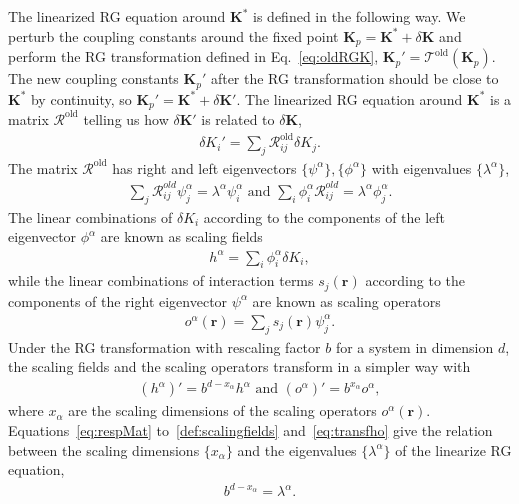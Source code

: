 \documentclass[aps,prr,reprint,superscriptaddress,floatfix]{revtex4-2}
\begin{document}
The linearized RG equation around $\mathbf{K}^{*}$ is defined in the following way.
We perturb the coupling constants around the fixed point $\mathbf{K}_p = \mathbf{K}^{*} + \delta \mathbf{K}$ and perform the RG transformation defined in Eq.~\eqref{eq:oldRGK}, $\mathbf{K}_p' = \mathcal{T}^{\text{old}}\left(\mathbf{K}_p\right)$. 
The new coupling constants $\mathbf{K}_p'$ after the RG transformation should be close to $\mathbf{K}^{*}$ by continuity, so $\mathbf{K}_p' = \mathbf{K}^{*} + \delta \mathbf{K}'$.
The linearized RG equation around $\mathbf{K}^{*}$ is a matrix $\mathcal{R}^{\text{old}}$ telling us how $\delta \mathbf{K}'$ is related to $\delta \mathbf{K}$,
%
\begin{align}\label{eq:respMat}
    \delta K_i' = \sum_j\mathcal{R}^{\text{old}}_{ij} \delta K_j.
\end{align}
%
The matrix $\mathcal{R}^{\text{old}}$ has right and left eigenvectors $\{\psi^{\alpha}\}, \{\phi^{\alpha}\}$ with eigenvalues $\{\lambda^{\alpha}\}$,
%
\begin{align}\label{eq:eigsofRespM}
    \sum_j \mathcal{R}^{old}_{ij} \psi^{\alpha}_j = \lambda^{\alpha}
    \psi^{\alpha}_i \text{ and } \sum_i \phi^{\alpha}_i
    \mathcal{R}^{old}_{ij} = \lambda^{\alpha} \phi^{\alpha}_j.
\end{align}
%
The linear combinations of $\delta K_i$ according to the components of the left eigenvector $\phi^{\alpha}$ are known as scaling fields
%
\begin{align}\label{def:scalingfields}
    h^{\alpha} = \sum_i \phi^{\alpha}_i \delta K_i,
\end{align}
%
while the linear combinations of interaction terms $s_j(\mathbf{r})$ according to the components of the right eigenvector $\psi^{\alpha}$ are known as scaling operators
%
\begin{align}\label{def:scalingOpt}
    o^{\alpha}(\mathbf{r}) = \sum_j s_j(\mathbf{r}) \psi^{\alpha}_j.
\end{align}
%
Under the RG transformation with rescaling factor $b$ for a system in dimension $d$, the scaling fields and the scaling operators transform in a simpler way with 
%
\begin{align}\label{eq:transfho}
    \left(h^{\alpha} \right)' = b^{d - x_{\alpha}} h^{\alpha} \text{ and }
    \left(o^{\alpha}\right)' = b^{x_{\alpha}} o^{\alpha},
\end{align}
where $x_{\alpha}$ are the scaling dimensions of the scaling operators $o^{\alpha}(\mathbf{r})$. 
Equations~\eqref{eq:respMat} to~\eqref{def:scalingfields} and~\eqref{eq:transfho} give the relation between the scaling dimensions $\{x_{\alpha}\}$ and the eigenvalues $\{\lambda^{\alpha}\}$ of the linearize RG equation, 
%
\begin{align}\label{eq:lambda2x}
    b^{d-x_{\alpha}} = \lambda^{\alpha}.
\end{align}
%
\end{document}
